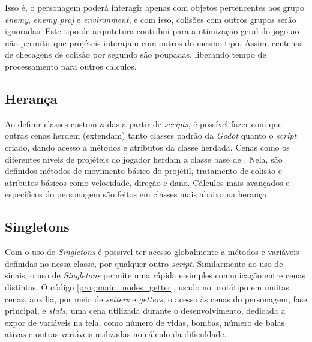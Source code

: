 Isso é, o personagem poderá interagir apenas com objetos pertencentes aos grupo \textit{enemy}, \textit{enemy proj} e \textit{environment}, e com isso, colisões com outros grupos serão ignoradas. Este tipo de arquitetura contribui para a otimização geral do jogo ao não permitir que projéteis interajam com outros do mesmo tipo. Assim, centenas de checagens de colisão por segundo são poupadas, liberando tempo de processamento para outros cálculos.

\subsection{Herança}

Ao definir classes customizadas a partir de \textit{scripts}, é possível fazer com que outras cenas herdem (extendam) tanto classes padrão da \textit{Godot} quanto o \textit{script} criado, dando acesso a métodos e atributos da classe herdada. Cenas como os diferentes níveis de projéteis do jogador herdam a classe base de \textquotedbl{}. Nela, são definidos métodos de movimento básico do projétil, tratamento de colisão e atributos básicos como velocidade, direção e dano. Cálculos mais avançados e específicos do personagem são feitos em classes mais abaixo na herança.

\subsection{Singletons}\label{Singletons}

Com o uso de \textit{Singletons} é possível ter acesso globalmente a métodos e variáveis definidas no nessa classe, por qualquer outro \textit{script}. Similarmente ao uso de sinais, o uso de \textit{Singletons} permite uma rápida e simples comunicação entre cenas distintas. O código \ref{prog:main_nodes_getter}, usado no protótipo em muitas cenas, auxilia, por meio de \textit{setters} e \textit{getters}, o acesso às cenas do personagem, fase principal, e \textit{stats}, uma cena utilizada durante o desenvolvimento, dedicada a expor de variáveis na tela, como número de vidas, bombas, número de balas ativas e outras variáveis utilizadas no cálculo da dificuldade.

%     

